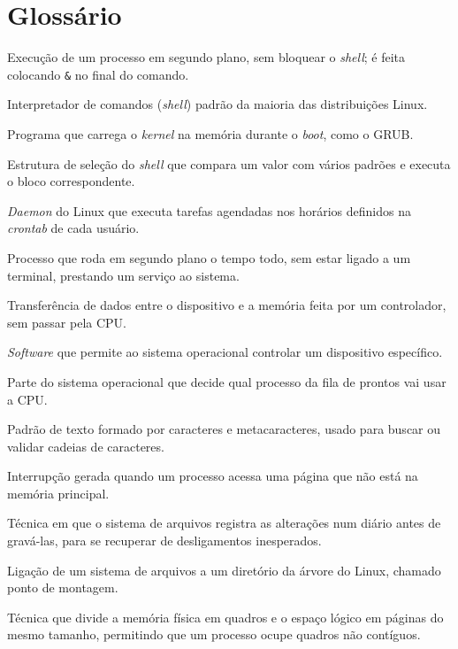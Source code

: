 \documentclass[12pt, a4paper, oneside, openany, chapter=TITLE, subsection=TITLE, section=TITLE, subsubsection=TITLE, subsubsubsection=TITLE, english, german, brazil]{abntex2}
\begin{document}
\chapter*[Glossário]{Glossário}
\begin{description}[style=nextline, leftmargin=1cm]
    \item[\textit{Background}] Execução de um processo em segundo plano, sem bloquear o \textit{shell}; é feita colocando \texttt{\&} no final do comando.
    \item[\textit{Bash}] Interpretador de comandos (\textit{shell}) padrão da maioria das distribuições Linux.
    \item[\textit{Bootloader}] Programa que carrega o \textit{kernel} na memória durante o \textit{boot}, como o GRUB.
    \item[\textit{Case}] Estrutura de seleção do \textit{shell} que compara um valor com vários padrões e executa o bloco correspondente.
    \item[\textit{Cron}] \textit{Daemon} do Linux que executa tarefas agendadas nos horários definidos na \textit{crontab} de cada usuário.
    \item[\textit{Daemon}] Processo que roda em segundo plano o tempo todo, sem estar ligado a um terminal, prestando um serviço ao sistema.
    \item[DMA] Transferência de dados entre o dispositivo e a memória feita por um controlador, sem passar pela CPU.
    \item[\textit{Driver}] \textit{Software} que permite ao sistema operacional controlar um dispositivo específico.
    \item[Escalonador] Parte do sistema operacional que decide qual processo da fila de prontos vai usar a CPU.
    \item[Expressão regular] Padrão de texto formado por caracteres e metacaracteres, usado para buscar ou validar cadeias de caracteres.
    \item[Falta de página] Interrupção gerada quando um processo acessa uma página que não está na memória principal.
    \item[\textit{Journaling}] Técnica em que o sistema de arquivos registra as alterações num diário antes de gravá-las, para se recuperar de desligamentos inesperados.
    \item[Montagem] Ligação de um sistema de arquivos a um diretório da árvore do Linux, chamado ponto de montagem.
    \item[Paginação] Técnica que divide a memória física em quadros e o espaço lógico em páginas do mesmo tamanho, permitindo que um processo ocupe quadros não contíguos.

\end{description}
\end{document}
